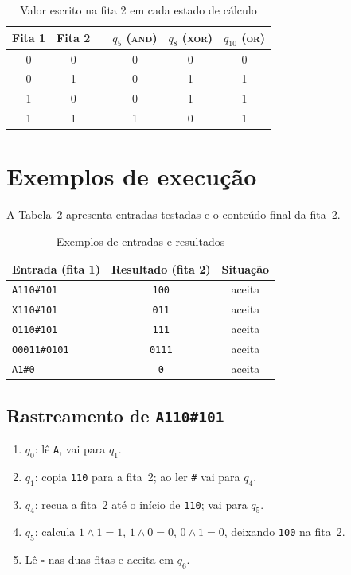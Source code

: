 \documentclass[report, 12pt]{uftreport}
\begin{document}
\begin{table}[htbp]
  \centering
  \caption{Valor escrito na fita 2 em cada estado de cálculo}
  \label{tab:verdade}
  \begin{tabular}{cccccc}
    \toprule
    \textbf{Fita 1} & \textbf{Fita 2} & & $q_5$ (\textsc{and})
      & $q_8$ (\textsc{xor}) & $q_{10}$ (\textsc{or}) \\
    \midrule
    0 & 0 & & 0 & 0 & 0 \\
    0 & 1 & & 0 & 1 & 1 \\
    1 & 0 & & 0 & 1 & 1 \\
    1 & 1 & & 1 & 0 & 1 \\
    \bottomrule
  \end{tabular}
\end{table}

\section{Exemplos de execução}

A Tabela~\ref{tab:exemplos} apresenta entradas testadas e o conteúdo final
da fita~2.

\begin{table}[htbp]
  \centering
  \caption{Exemplos de entradas e resultados}
  \label{tab:exemplos}
  \begin{tabular}{lcc}
    \toprule
    \textbf{Entrada (fita 1)} & \textbf{Resultado (fita 2)} & \textbf{Situação} \\
    \midrule
    \texttt{A110\#101}    & \texttt{100}  & aceita \\
    \texttt{X110\#101}    & \texttt{011}  & aceita \\
    \texttt{O110\#101}    & \texttt{111}  & aceita \\
    \texttt{O0011\#0101}  & \texttt{0111} & aceita \\
    \texttt{A1\#0}        & \texttt{0}    & aceita \\
    \bottomrule
  \end{tabular}
\end{table}

\subsection{Rastreamento de \texttt{A110\#101}}

\begin{enumerate}
  \item $q_0$: lê \texttt{A}, vai para $q_1$.
  \item $q_1$: copia \texttt{110} para a fita~2; ao ler \texttt{\#} vai para $q_4$.
  \item $q_4$: recua a fita~2 até o início de \texttt{110}; vai para $q_5$.
  \item $q_5$: calcula $1\land1=1$, $1\land0=0$, $0\land1=0$, deixando
        \texttt{100} na fita~2.
  \item Lê $\square$ nas duas fitas e aceita em $q_6$.
\end{enumerate}
\end{document}
